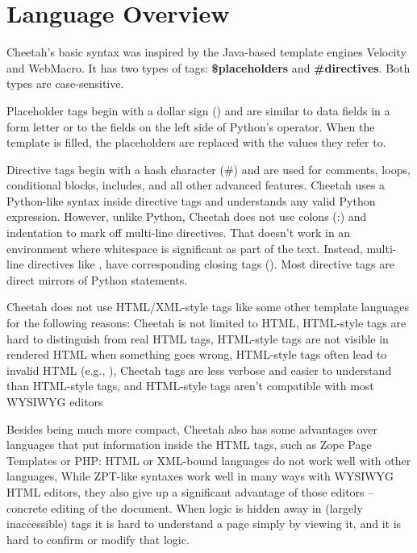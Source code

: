 \section{Language Overview}
\label{language}


Cheetah's basic syntax was inspired by the Java-based template engines Velocity
and WebMacro. It has two types of tags: {\bf \$placeholders} and {\bf
\#directives}.  Both types are case-sensitive.  

Placeholder tags begin with a dollar sign () and are similar to
data fields in a form letter or to the  fields on the left side
of Python's \code{\%} operator. When the template is filled, the placeholders
are replaced with the values they refer to.

Directive tags begin with a hash character (\#) and are used for comments,
loops, conditional blocks, includes, and all other advanced features. Cheetah
uses a Python-like syntax inside directive tags and understands any valid
Python expression.  However, unlike Python, Cheetah does not use colons (:) and
indentation to mark off multi-line directives.  That doesn't work in an
environment where whitespace is significant as part of the text.  Instead,
multi-line directives like , have  corresponding closing tags
 ().  Most directive tags are direct
mirrors of Python statements.

Cheetah does not use HTML/XML-style tags like some other template languages for
the following reasons:
 Cheetah is not limited to HTML,
 HTML-style tags are hard to distinguish from real HTML tags,
 HTML-style tags are not visible in rendered HTML when something goes wrong,
 HTML-style tags often lead to invalid HTML (e.g., 
),
Cheetah tags are less verbose and easier to understand than HTML-style tags, 
and HTML-style tags aren't compatible with most WYSIWYG editors

Besides being much more compact, Cheetah also has some advantages over
languages that put information inside the HTML tags, such as Zope Page
Templates or PHP:
 HTML or XML-bound languages do not work well with other languages,
 While ZPT-like syntaxes work well in many ways with WYSIWYG HTML editors,
     they also give up a significant advantage of those editors -- concrete
     editing of the document.  When logic is hidden away in (largely
     inaccessible) tags it is hard to understand a page simply by viewing it,
     and it is hard to confirm or modify that logic.

